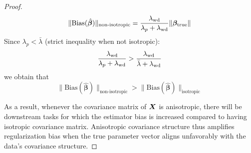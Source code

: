\begin{proof}
\begin{align*}
\|\text{Bias}(\hat{\boldsymbol{\beta}})\|_{\text{non-isotropic}} = \frac{\lambda_{\rm wd}}{\lambda_p + \lambda_{\rm wd}} \|\boldsymbol{\beta}_{\text{true}}\|
\end{align*}
Since $\lambda_p < \bar{\lambda}$ (strict inequality when not isotropic):
\begin{equation*}
\frac{\lambda_{\rm wd}}{\lambda_p + \lambda_{\rm wd}} > \frac{\lambda_{\rm wd}}{\bar{\lambda} + \lambda_{\rm wd}}
\end{equation*}
we obtain that
\begin{equation*}
\|\text{Bias}(\hat{\boldsymbol{\beta}})\|_{\text{non-isotropic}} > \|\text{Bias}(\hat{\boldsymbol{\beta}})\|_{\text{isotropic}}
\end{equation*}


As a result, whenever the covariance matrix of ${\bm{X}}$ is anisotropic, there will be downstream tasks for which the estimator bias is increased compared to having isotropic covariance matrix.
Anisotropic covariance structure thus amplifies regularization bias when the true parameter vector aligns unfavorably with the data's covariance structure.
\end{proof}






